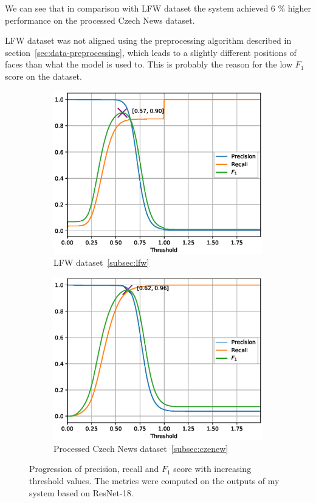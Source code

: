 We can see that in comparison with LFW dataset the system achieved 6 \% higher performance on the processed
Czech News dataset.

LFW dataset was not aligned using the preprocessing algorithm described in section~\ref{sec:data-preprocessing},
which leads to a slightly different positions of faces than what the model is used to.
This is probably the reason for the low $F_1$ score on the dataset.

\begin{figure}[H]
    \begin{subfigure}{\textwidth}
        \centering
        \includegraphics[width=0.95\columnwidth]{images/implementation/prft_lfw-align-128.eps}
        \caption{LFW dataset~\ref{subsec:lfw}}
        \label{fig:prft_arcface_lfw}
    \end{subfigure}

    \begin{subfigure}{\textwidth}
        \centering
        \includegraphics[width=0.95\columnwidth]{images/implementation/prft_fav-128_N1.eps}
        \caption{Processed Czech News dataset~\ref{subsec:czenew}}
        \label{fig:prft_arcface_cze}
    \end{subfigure}
    \caption{Progression of precision, recall and $F_1$ score with increasing threshold values. The metrics were
    computed on the outputs of my system based on ResNet-18.}
    \label{fig:prft}
\end{figure}


